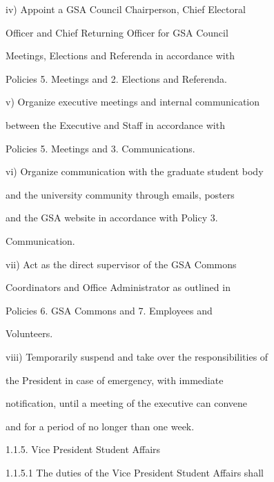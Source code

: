          iv)      Appoint  a  GSA  Council  Chairperson,  Chief  Electoral  

                  Officer  and  Chief  Returning  Officer  for  GSA  Council  

                  Meetings,  Elections  and  Referenda  in  accordance  with  

                  Policies 5. Meetings and 2. Elections and Referenda.   

  

  

  

         v)       Organize executive meetings and internal communication  

                  between  the  Executive  and  Staff  in  accordance  with  

                  Policies 5. Meetings and 3. Communications.   

  

         vi)      Organize communication with the graduate student body  

                  and  the  university  community  through  emails,  posters  

                  and   the   GSA   website  in   accordance  with  Policy   3.  

                  Communication.   

  

         vii)     Act  as  the  direct  supervisor  of  the  GSA  Commons  

                  Coordinators  and  Office  Administrator  as  outlined  in  

                  Policies      6.   GSA      Commons   and            7.   Employees   and  

                  Volunteers.   

  

         viii)    Temporarily suspend and take over the responsibilities of  

                  the  President  in  case  of  emergency,  with  immediate  

                  notification, until a meeting of the executive can convene  

                  and for a period of no longer than one week.   

1.1.5. Vice President Student Affairs  

1.1.5.1           The  duties  of  the  Vice  President  Student  Affairs  shall  

